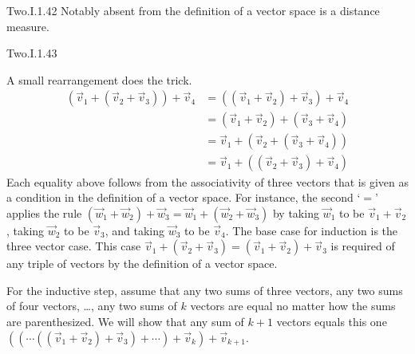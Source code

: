 \begin{ans}{Two.I.1.42}
      Notably absent from the definition of a vector space is a distance
      measure.
    
\end{ans}
\begin{ans}{Two.I.1.43}
      \begin{exparts}
        \partsitem A small rearrangement does the trick.
          \begin{align*}
            (\vec{v}_1+(\vec{v}_2+\vec{v}_3))+\vec{v}_4
            &=((\vec{v}_1+\vec{v}_2)+\vec{v}_3)+\vec{v}_4  \\
            &=(\vec{v}_1+\vec{v}_2)+(\vec{v}_3+\vec{v}_4)  \\
            &=\vec{v}_1+(\vec{v}_2+(\vec{v}_3+\vec{v}_4))  \\
            &=\vec{v}_1+((\vec{v}_2+\vec{v}_3)+\vec{v}_4)
          \end{align*}
          Each equality above follows from the associativity of three vectors
          that is given as a condition in the definition of a vector space.
          For instance, the second `$=$' applies the rule
          $(\vec{w}_1+\vec{w}_2)+\vec{w}_3=\vec{w}_1+(\vec{w}_2+\vec{w}_3)$
          by taking $\vec{w}_1$ to be $\vec{v}_1+\vec{v}_2$,
          taking $\vec{w}_2$ to be $\vec{v}_3$,
          and taking $\vec{w}_3$ to be $\vec{v}_4$.
        \partsitem The base case for induction is the three vector case.
          This case
          \( \vec{v}_1+(\vec{v}_2+\vec{v}_3)
          =(\vec{v}_1+\vec{v}_2)+\vec{v}_3 \) is required of any triple of
          vectors by the definition of a vector space.

          For the inductive step, assume that any two sums of three vectors,
          any two sums of four vectors,
          \ldots, any two sums of $k$ vectors
          are equal no matter how the sums are parenthesized.
          We will show that any sum of \( k+1 \) vectors equals this one
          \( ((\cdots((\vec{v}_1+\vec{v}_2)+\vec{v}_3)+\cdots)+\vec{v}_k)
              +\vec{v}_{k+1} \).


\end{exparts}
\end{ans}
